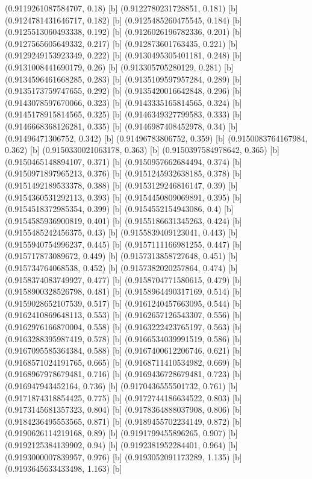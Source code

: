 {{{(0.9119261087584707, 0.18) [b] 
(0.9122780231728851, 0.181) [b] 
(0.9124781431646717, 0.182) [b] 
(0.9125485260475545, 0.184) [b] 
(0.9125513060493338, 0.192) [b] 
(0.9126026196782336, 0.201) [b] 
(0.9127565605649332, 0.217) [b] 
(0.912873601763435, 0.221) [b] 
(0.9129249153923349, 0.222) [b] 
(0.9130495305401181, 0.248) [b] 
(0.9131008441690179, 0.26) [b] 
(0.913305705280129, 0.281) [b] 
(0.9134596461668285, 0.283) [b] 
(0.9135109597957284, 0.289) [b] 
(0.9135173759747655, 0.292) [b] 
(0.9135420016642848, 0.296) [b] 
(0.9143078597670066, 0.323) [b] 
(0.9143335165814565, 0.324) [b] 
(0.9145178915814565, 0.325) [b] 
(0.9146349327799583, 0.333) [b] 
(0.9146668368126281, 0.335) [b] 
(0.9146987408452978, 0.34) [b] 
(0.91496471306752, 0.342) [b] 
(0.91496783806752, 0.359) [b] 
(0.9150083764167984, 0.362) [b] 
(0.9150330021063178, 0.363) [b] 
(0.9150397584978642, 0.365) [b] 
(0.9150465148894107, 0.371) [b] 
(0.9150957662684494, 0.374) [b] 
(0.9150971897965213, 0.376) [b] 
(0.9151245932638185, 0.378) [b] 
(0.9151492189533378, 0.388) [b] 
(0.9153129246816147, 0.39) [b] 
(0.9154360531292113, 0.393) [b] 
(0.9154450809069891, 0.395) [b] 
(0.9154518372985354, 0.399) [b] 
(0.9154552154943086, 0.4) [b] 
(0.9154585936900819, 0.401) [b] 
(0.9155186631345263, 0.424) [b] 
(0.9155485242456375, 0.43) [b] 
(0.9155839409123041, 0.443) [b] 
(0.9155940754996237, 0.445) [b] 
(0.9157111166981255, 0.447) [b] 
(0.915717873089672, 0.449) [b] 
(0.9157313858727648, 0.451) [b] 
(0.915734764068538, 0.452) [b] 
(0.9157382020257864, 0.474) [b] 
(0.9158374083749927, 0.477) [b] 
(0.9158704771580615, 0.479) [b] 
(0.9158900328526798, 0.481) [b] 
(0.9158964490317169, 0.514) [b] 
(0.9159028652107539, 0.517) [b] 
(0.9161240457663095, 0.544) [b] 
(0.9162410869648113, 0.553) [b] 
(0.9162657126543307, 0.556) [b] 
(0.9162976166870004, 0.558) [b] 
(0.9163222423765197, 0.563) [b] 
(0.9163288395987419, 0.578) [b] 
(0.9166534039991519, 0.586) [b] 
(0.9167095585364384, 0.588) [b] 
(0.9167400612206746, 0.621) [b] 
(0.9168571024191765, 0.665) [b] 
(0.9168711410534982, 0.669) [b] 
(0.9168967978679481, 0.716) [b] 
(0.9169436728679481, 0.723) [b] 
(0.916947943452164, 0.736) [b] 
(0.9170436555501732, 0.761) [b] 
(0.9171874318854425, 0.775) [b] 
(0.9172744186634522, 0.803) [b] 
(0.9173145681357323, 0.804) [b] 
(0.9178364888037908, 0.806) [b] 
(0.9184236495553565, 0.871) [b] 
(0.9189455702234149, 0.872) [b] 
(0.9190626114219168, 0.89) [b] 
(0.9191799455896265, 0.907) [b] 
(0.9192125384139902, 0.94) [b] 
(0.9192381952284401, 0.964) [b] 
(0.9193000007839957, 0.976) [b] 
(0.9193052091173289, 1.135) [b] 
(0.9193645633433498, 1.163) [b] 
}}}
